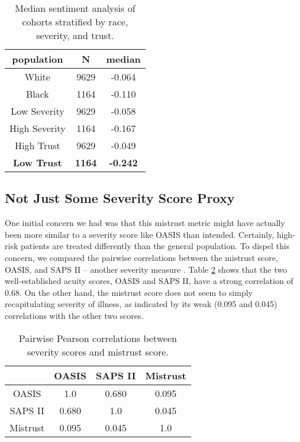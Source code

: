 \documentclass{article}
\begin{document}
\begin{table}
  \begin{center}
    \center
    \caption{Median sentiment analysis of cohorts stratified by race, severity, and trust.\\}
    \label{tab:sa-results}
    \begin{tabular}{|c|c|c|}
    	\hline
                     \textbf{population} & \textbf{N} & \textbf{median} \\ \hline \hline
                         White         & 9629  & -0.064 \\ 
                         Black         & 1164  & -0.110 \\ \hline \hline
                         Low Severity  & 9629  & -0.058 \\ 
                         High Severity & 1164  & -0.167 \\ \hline \hline
                         High Trust    & 9629  & -0.049 \\ 
                         \textbf{Low Trust}     & \textbf{1164}  & \textbf{-0.242} \\ \hline \hline
    \end{tabular}
  \end{center}
\end{table}



\subsection{Not Just Some Severity Score Proxy}

One initial concern we had was that this mistrust metric might have actually been more similar to a severity score like OASIS than intended. Certainly, high-risk patients are treated differently than the general population. To dispel this concern, we compared the pairwise correlations between the mistrust score, OASIS, and SAPS II -- another severity measure \cite{sapsii}. Table \ref{tab:correlations} shows that the two well-established acuity scores, OASIS and SAPS II, have a strong correlation of 0.68. On the other hand, the mistrust score does not seem to simply recapitulating severity of illness, as indicated by its weak (0.095 and 0.045) correlations with the other two scores.

\begin{table}
  \begin{center}
    \caption{Pairwise Pearson correlations between severity scores and mistrust score.\\}
    \label{tab:correlations}
    \hspace*{-1cm}
    \begin{tabular}{|c||c|c|c|}
    	\hline
                 & OASIS & SAPS II & Mistrust \\ \hline \hline
        OASIS    & 1.0   & 0.680   & 0.095    \\ \hline
        SAPS II  & 0.680 & 1.0     & 0.045    \\ \hline
        Mistrust & 0.095 & 0.045   & 1.0      \\ \hline
    \end{tabular}
  \end{center}
\end{table}
\end{document}
